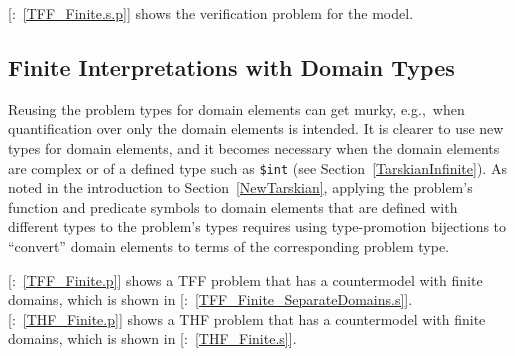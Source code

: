 \documentclass{easychair}
\newcommand{\smalltt}[1]{\small \texttt{#1}}
\newcommand{\example}{{\scriptsize \faFile[regular]}}
\begin{document}
[\example{}:~\ref{TFF_Finite.s.p}] shows the verification problem for 
the model.

\subsection{Finite Interpretations with Domain Types}
\label{TarskianNewFiniteTypes}

Reusing the problem types for domain elements can get murky, e.g.,~when quantification over only 
the domain elements is intended. 
It is clearer to use new types for domain elements, and it becomes necessary when the domain 
elements are complex or of a defined type such as \smalltt{\$int} (see 
Section~\ref{TarskianInfinite}).
As noted in the introduction to Section~\ref{NewTarskian}, applying the problem's function and 
predicate symbols to domain elements that are defined with different types to the problem's types 
requires using type-promotion bijections to ``convert'' domain elements to terms of the 
corresponding problem type.

[\example{}:~\ref{TFF_Finite.p}] shows a TFF problem that has a 
countermodel with finite domains, which is shown in 
[\example{}:~\ref{TFF_Finite_SeparateDomains.s}].
[\example{}:~\ref{THF_Finite.p}] shows a THF problem that has a 
countermodel with finite domains, which is shown in
[\example{}:~\ref{THF_Finite.s}].
\end{document}
